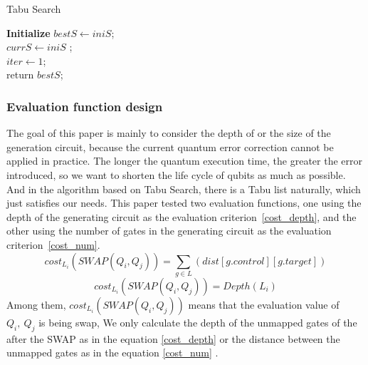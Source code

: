 \documentclass[runningheads]{llncs}
\begin{document}
			\begin{algorithm} 
			\label{algorithm_Tabu}
				\caption{Tabu Search }  
				\LinesNumbered  
				\textbf{Initialize}
					$bestS  \leftarrow iniS$; \\
					$currS \leftarrow iniS$ ;\\
					$iter \leftarrow 1$;\\
				return $bestS$;
				\end{algorithm}
\subsubsection{Evaluation function design }
The goal of this paper is mainly to consider the depth of or the size of the generation circuit,
because the current quantum error correction cannot be applied in practice. 
The longer the quantum execution time, the greater the error introduced, 
so we want to shorten the life cycle of qubits as much as possible.
And in the algorithm based on Tabu Search, there is a Tabu list naturally, which just satisfies our needs.
This paper tested two evaluation functions, 
one using the depth of the generating circuit as the evaluation criterion~\ref{cost_depth}, 
and the other using the number of gates in the generating circuit as the evaluation criterion~\ref{cost_num}.
\begin{equation}
	cost_{L_{i}}(SWAP(Q_{i},Q_{j}))= \sum_{g \in L}(dist[g.control][g.target])
	\label{cost_num}
	\end{equation}
	\begin{equation}
		cost_{L_{i}}(SWAP(Q_{i},Q_{j}))= Depth(L_{i})
		\label{cost_depth}
		\end{equation}
Among them, $cost_{L_{i}}(SWAP(Q_{i},Q_{j}))$ means that the evaluation value of $Q_{i},\ Q_{j}$ is being swap,
We only calculate the depth of the unmapped gates of the after the SWAP as in the equation \ref{cost_depth}
 or the distance between the unmapped gates as in the equation \ref{cost_num} .
\end{document}
